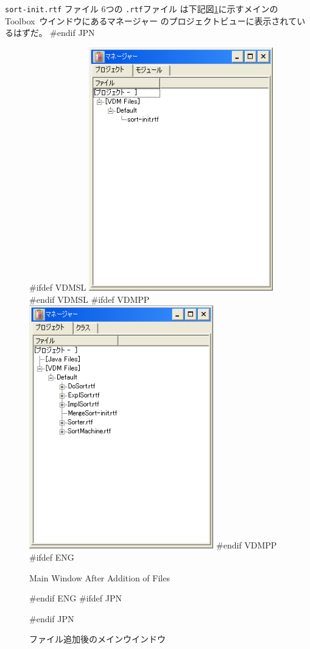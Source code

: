 \documentclass[\pformat,12pt]{article}
\newcommand{\Toolbox}{Toolbox}
\newcommand{\Toolbox}{Toolbox}
\newcommand{\guicmd}[1]{{\sf #1}}
\newcommand{\guicmd}[1]{{\gt #1}}
\begin{document}
{
  {\tt sort-init.rtf} ファイル
}
{
  6つの {\tt .rtf}ファイル
}
は下記図\ref{fig:addedfiles}に示すメインの
\Toolbox\ ウインドウにある\guicmd{マネージャー} の\guicmd{プロジェクトビュー}に表示されているはずだ。
#endif JPN

\begin{figure}[tbh]
\begin{center}
#ifdef VDMSL
\includegraphics[width=8cm]{addedFiles-sl.png}
#endif VDMSL
#ifdef VDMPP
\includegraphics[width=8cm]{addedFiles-pp.png}
#endif VDMPP
#ifdef ENG
\caption{Main Window After Addition of Files}
#endif ENG
#ifdef JPN
\caption{ファイル追加後のメインウインドウ}
#endif JPN
\label{fig:addedfiles}
\end{center}
\end{figure}
\end{document}
